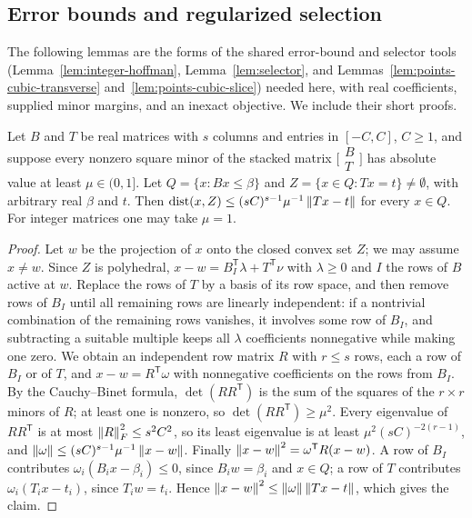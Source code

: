 \subsection{Error bounds and regularized selection}
\label{app:recourse-analytic}

The following lemmas are the forms of the shared error-bound and
selector tools (Lemma~\ref{lem:integer-hoffman},
Lemma~\ref{lem:selector}, and Lemmas~\ref{lem:points-cubic-transverse}
and~\ref{lem:points-cubic-slice}) needed here, with real coefficients, supplied
minor margins, and an inexact objective. We include their short proofs.

\begin{lemma}
\label{lem:recourse-hoffman}
Let $B$ and $T$ be real matrices with $s$ columns and entries in
$[-C,C]$, $C\ge1$, and suppose every nonzero square minor of the stacked
matrix $\bigl[\begin{smallmatrix}B\\T\end{smallmatrix}\bigr]$ has
absolute value at least $\mu\in(0,1]$. Let $Q=\{x:Bx\le\beta\}$ and
$Z=\{x\in Q:Tx=t\}\ne\emptyset$, with arbitrary real $\beta$ and $t$.
Then $\operatorname{dist}(x,Z)\le(sC)^{s-1}\mu^{-1}\left\lVert Tx-t\right\rVert$ for every $x\in Q$.
For integer matrices one may take $\mu=1$.
\end{lemma}

\begin{proof}
Let $w$ be the projection of $x$ onto the closed convex set $Z$; we may
assume $x\ne w$. Since $Z$ is polyhedral, $x-w=B_I^{\mathsf T}\lambda
+T^{\mathsf T}\nu$ with $\lambda\ge0$ and $I$ the rows of $B$ active at
$w$. Replace the rows of $T$ by a basis of its row space, and then
remove rows of $B_I$ until all remaining rows are linearly independent:
if a nontrivial combination of the remaining rows vanishes, it involves
some row of $B_I$, and subtracting a suitable multiple keeps all
$\lambda$ coefficients nonnegative while making one zero. We obtain an
independent row matrix $R$ with $r\le s$ rows, each a row of $B_I$ or
of $T$, and $x-w=R^{\mathsf T}\omega$ with nonnegative coefficients on
the rows from $B_I$. By the Cauchy--Binet formula, $\det(RR^{\mathsf T})$
is the sum of the squares of the $r\times r$ minors of $R$; at least
one is nonzero, so $\det(RR^{\mathsf T})\ge\mu^2$. Every eigenvalue of
$RR^{\mathsf T}$ is at most $\left\lVert R\right\rVert_F^2\le s^2C^2$, so its least
eigenvalue is at least $\mu^2(sC)^{-2(r-1)}$, and
$\left\lVert\omega\right\rVert\le(sC)^{s-1}\mu^{-1}\left\lVert x-w\right\rVert$. Finally
$\left\lVert x-w\right\rVert^2=\omega^{\mathsf T}R(x-w)$. A row of $B_I$ contributes
$\omega_i(B_ix-\beta_i)\le0$, since $B_iw=\beta_i$ and $x\in Q$; a row
of $T$ contributes $\omega_i(T_ix-t_i)$, since $T_iw=t_i$. Hence
$\left\lVert x-w\right\rVert^2\le\left\lVert\omega\right\rVert\left\lVert Tx-t\right\rVert$, which gives the claim.
\end{proof}

